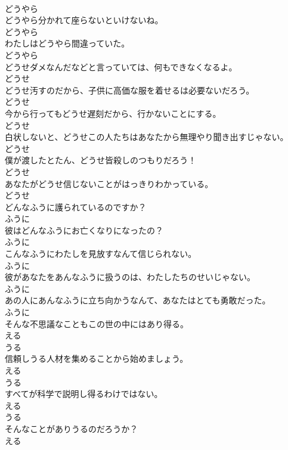 \documentclass[8pt]{extreport}
\begin{document}
\begin{CJK}{UTF8}{min}
\\	どうやら
\\	どうやら分かれて座らないといけないね。	
\\	どうやら
\\	わたしはどうやら間違っていた。	
\\	どうやら
\\	どうせダメなんだなどと言っていては、何もできなくなるよ。	
\\	どうせ
\\	どうせ汚すのだから、子供に高価な服を着せるは必要ないだろう。	
\\	どうせ
\\	今から行ってもどうせ遅刻だから、行かないことにする。	
\\	どうせ
\\	白状しないと、どうせこの人たちはあなたから無理やり聞き出すじゃない。	
\\	どうせ
\\	僕が渡したとたん、どうせ皆殺しのつもりだろう！	
\\	どうせ
\\	あなたがどうせ信じないことがはっきりわかっている。	
\\	どうせ
\\	どんなふうに護られているのですか？	
\\	ふうに
\\	彼はどんなふうにお亡くなりになったの？	
\\	ふうに
\\	こんなふうにわたしを見放すなんて信じられない。	
\\	ふうに
\\	彼があなたをあんなふうに扱うのは、わたしたちのせいじゃない。	
\\	ふうに
\\	あの人にあんなふうに立ち向かうなんて、あなたはとても勇敢だった。	
\\	ふうに
\\	そんな不思議なこともこの世の中にはあり得る。	
\\	える 
\\	うる
\\	信頼しうる人材を集めることから始めましょう。	
\\	える 
\\	うる
\\	すべてが科学で説明し得るわけではない。	
\\	える 
\\	うる
\\	そんなことがありうるのだろうか？	
\\	える 

\end{CJK}
\end{document}
